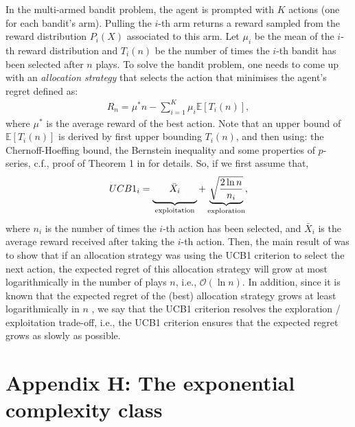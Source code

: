 \documentclass[twoside,11pt]{article}
\begin{document}
In the multi-armed bandit problem, the agent is prompted with $K$ actions (one for each bandit's arm). Pulling the $i$-th arm returns a reward sampled from the reward distribution $P_i(X)$ associated to this arm. Let $\mu_i$ be the mean of the $i$-th reward distribution and $T_i(n)$ be the number of times the $i$-th bandit has been selected after $n$ plays. To solve the bandit problem, one needs to come up with an \textit{allocation strategy} that selects the action that minimises the agent's regret defined as:
\begin{align}
R_n = \mu^*n  - \sum_{i=1}^K \mu_i \mathbb{E} [T_i(n)],
\end{align}
where $\mu^*$ is the average reward of the best action. Note that an upper bound of $\mathbb{E} [T_i(n)]$ is derived by first upper bounding $T_i(n)$, and then using: the Chernoff-Hoeffing bound, the Bernstein inequality and some properties of $p$-series, c.f., proof of Theorem 1 in \citet{Auer2002} for details. So, if we first assume that,
\begin{align}
UCB1_i = \underbrace{{\color{white}\sqrt{\frac{1}{1}}} \bar{X}_i{\color{white}\sqrt{\frac{1}{1}}}}_{\text{exploitation}} + \underbrace{\sqrt{\frac{2 \ln n}{n_i}}}_{\text{exploration}},
\end{align}
where $n_i$ is the number of times the $i$-th action has been selected, and $\bar{X}_i$ is the average reward received after taking the $i$-th action. Then, the main result of \citet{Auer2002} was to show that if an allocation strategy was using the UCB1 criterion to select the next action, the expected regret of this allocation strategy will grow at most logarithmically in the number of plays $n$, i.e., $\mathcal{O}(\ln n)$. In addition, since it is known that the expected regret of the (best) allocation strategy grows at least logarithmically in $n$ \citep{UBC1_nln_opt}, we say that the UCB1 criterion resolves the exploration / exploitation trade-off, i.e., the UCB1 criterion ensures that the expected regret grows as slowly as possible.

\section*{Appendix H: The exponential complexity class}
\end{document}

